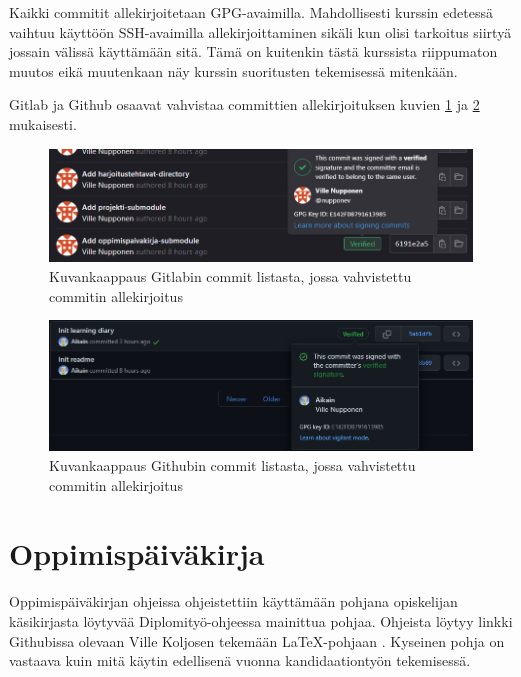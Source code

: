 Kaikki commitit allekirjoitetaan GPG-avaimilla. Mahdollisesti kurssin edetessä
vaihtuu käyttöön SSH-avaimilla allekirjoittaminen sikäli kun olisi tarkoitus
siirtyä jossain välissä käyttämään sitä. Tämä on kuitenkin tästä kurssista
riippumaton muutos eikä muutenkaan näy kurssin suoritusten tekemisessä
mitenkään.

Gitlab ja Github osaavat vahvistaa committien allekirjoituksen kuvien
\ref{fig:gitlab-commit-verified} ja \ref{fig:github-commit-verified}
mukaisesti.

\begin{figure}[h!]
    \includegraphics[width=\textwidth]{figures/gitlab-commit-verified.png}
    \caption{Kuvankaappaus Gitlabin commit listasta, jossa vahvistettu commitin allekirjoitus}
    \label{fig:gitlab-commit-verified}
\end{figure}

\begin{figure}[h!]
    \includegraphics[width=\textwidth]{figures/github-commit-verified.png}
    \caption{Kuvankaappaus Githubin commit listasta, jossa vahvistettu commitin allekirjoitus}
    \label{fig:github-commit-verified}
\end{figure}

\section{Oppimispäiväkirja}

Oppimispäiväkirjan ohjeissa ohjeistettiin käyttämään pohjana opiskelijan
käsikirjasta löytyvää Diplomityö-ohjeessa \parencite{TuniIntraDiplomityo}
mainittua pohjaa. Ohjeista löytyy linkki Githubissa olevaan Ville Koljosen
tekemään LaTeX-pohjaan \parencite{GithubVillekolTauLatexThesisTemplate}.
Kyseinen pohja on vastaava kuin mitä käytin edellisenä vuonna kandidaationtyön
\parencite{GithubAikainCOMP200} tekemisessä.

